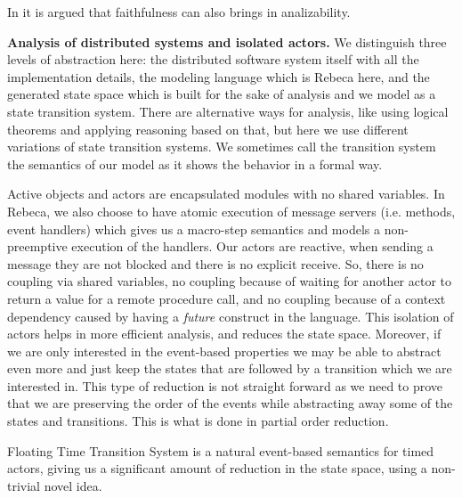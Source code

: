 In \cite{Friendliness} it is argued that faithfulness can also brings in analizability.

\noindent\textbf{Analysis of distributed systems and isolated actors.}
We distinguish three levels of abstraction here: the distributed software system itself with all the implementation details, the modeling language which is Rebeca here, and the generated state space which is built for the sake of analysis and  we model as a state transition system. There are alternative ways for analysis, like using logical theorems and applying reasoning based on that, but here we use different variations of state transition systems.
We sometimes call the transition system the semantics of our model as it shows the behavior in a formal way.


Active objects and actors are encapsulated modules with no shared variables. In Rebeca, we also choose to have atomic execution of message servers (i.e. methods, event handlers) which gives us a macro-step semantics and models a non-preemptive execution of the handlers.
Our actors are reactive, when sending a message they are not blocked and there is no explicit receive. So, there is no coupling via shared variables, no coupling because of waiting for another actor to return a value for a remote procedure call, and no coupling because of a context dependency caused by having a \textit{future}  construct in the language.
This isolation of actors helps in more efficient analysis, and reduces the state space.
Moreover, if we are only interested in the event-based properties we may be able to abstract even more and just keep the states that are followed by a transition which we are interested in. This type of reduction is not straight forward as we need to prove that we are preserving the order of the events while abstracting away some of the states and transitions. This is what is done in partial order reduction.

Floating Time Transition System is a natural event-based semantics for timed actors, giving us a significant amount of reduction in the state space, using a non-trivial novel idea.
	